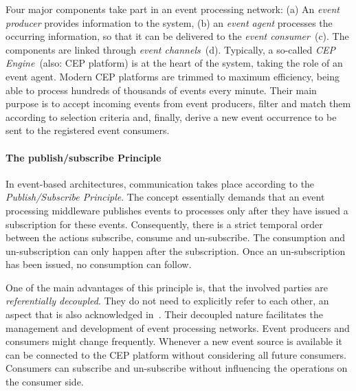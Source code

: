 Four major components take part in an event processing network: (a) An \textit{event producer} provides information to the system, (b) an \textit{event agent} processes the occurring information, so that it can be delivered to the \textit{event consumer}~(c). The components are linked through \textit{event channels}~(d).
Typically, a so-called \textit{\acs{CEP} Engine}~(also: CEP platform) is at the heart of the system, taking the role of an event agent.
Modern CEP platforms are trimmed to maximum efficiency, being able to process hundreds of thousands of events every minute.
Their main purpose is to accept incoming events from event producers, filter and match them according to selection criteria and, finally, derive a new event occurrence to be sent to the registered event consumers.


\paragraph{The publish/subscribe Principle}
In event-based architectures, communication takes place according to the \textit{Publish/Subscribe Principle}.
The concept essentially demands that an event processing middleware publishes events to processes only after they have issued a subscription for these events.
Consequently, there is a strict temporal order between the actions subscribe, consume and un-subscribe. The consumption and un-subscription can only happen after the subscription. Once an un-subscription has been issued, no consumption can follow.~\cite{tanenbaum:2007}

One of the main advantages of this principle is, that the involved parties are \textit{referentially decoupled}. They do not need to explicitly refer to each other, an aspect that is also acknowledged in~\cite{evtprocessing}.
Their decoupled nature facilitates the management and development of event processing networks. Event producers and consumers might change frequently.
Whenever a new event source is available it can be connected to the CEP platform without considering all future consumers. Consumers can subscribe and un-subscribe without influencing the operations on the consumer side.



